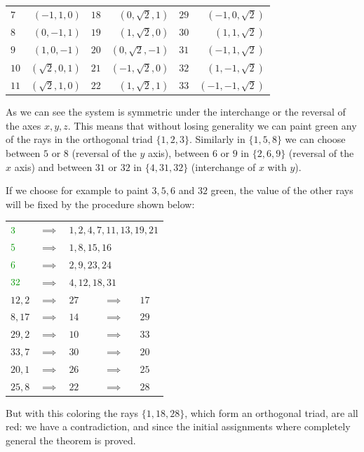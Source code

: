 \documentclass[a4paper]{article}
\newcommand{\red}[1]{\textcolor{dred}{#1}}
\newcommand{\green}[1]{\textcolor{dgreen}{#1}}
\theoremstyle{definition}
\let\oldproof\proof
\let\oldendproof\endproof
\renewenvironment{proof}
    {
        \begin{framed} 
        \oldproof
    }
    {
        \oldendproof 
        \end{framed}
    }
\begin{document}
\begin{proof}
\begin{center}
\begin{tabular}{lrlrlr}
        $7$ & $(-1, 1, 0)$ & $18$ & $(0, \sqrt{2}, 1)$  & $29$ & $(-1, 0,\sqrt{2})$ \\
        $8$ & $(0, -1, 1)$ & $19$ & $(1, \sqrt{2}, 0)$  & $30$ & $(1,1,\sqrt{2})$ \\
        $9$ & $(1, 0, -1)$ & $20$ & $(0, \sqrt{2}, -1)$  & $31$ & $(-1, 1, \sqrt{2})$ \\
        $10$ & $(\sqrt{2}, 0, 1)$ & $21$ & $(-1, \sqrt{2}, 0)$  & $32$ & $(1,-1, \sqrt{2})$ \\
        $11$ & $(\sqrt{2}, 1, 0)$ & $22$ & $(1, \sqrt{2}, 1)$  & $33$ & $(-1,-1, \sqrt{2})$ \\
    \end{tabular}   
    \end{center}
    As we can see the system is symmetric under the interchange or the reversal
    of the axes $x,y,z$.
    This means that without losing generality we can paint green any of
    the rays in the orthogonal triad $\{1,2,3\}$.
    Similarly in $\{1,5,8\}$  we can choose between $5$ or $8$ (reversal of the
    $y$ axis), between $6$ or $9$ in $\{2,6,9\}$ (reversal of the $x$ axis)
     and between $31$ or $32$ in $\{4,31,32\}$ (interchange of $x$ with $y$).

    If we choose for example to paint $3,5,6$ and $32$ green, the value of the other rays
    will be fixed by the procedure shown below: \\
    \begin{center}
    \begin{tabular}{lclcl}
        $\green{3}$  & $\implies$ & \multicolumn{3}{l}{\red{$1, 2, 4, 7,11, 13, 19, 21$}}\\
        $\green{5}$  & $\implies$ & \multicolumn{3}{l}{\red{$1, 8, 15, 16$}} \\
        $\green{6}$  & $\implies$ & \multicolumn{3}{l}{\red{$2, 9, 23, 24$}} \\
        $\green{32}$ & $\implies$ & \multicolumn{3}{l}{\red{$4,12,18,31$}} \\
        \midrule
        \red{$12,2$} & $\implies$ & \green{$27$} & $\implies$ & \red{$17$} \\
        \red{$8,17$} & $\implies$ & \green{$14$} & $\implies$ & \red{$29$} \\
        \red{$29,2$} & $\implies$ & \green{$10$} & $\implies$ & \red{$33$} \\
        \red{$33,7$} & $\implies$ & \green{$30$} & $\implies$ & \red{$20$} \\
        \red{$20,1$} & $\implies$ & \green{$26$} & $\implies$ & \red{$25$} \\
        \red{$25,8$} & $\implies$ & \green{$22$} & $\implies$ & \red{$28$} \\
    \end{tabular}
    \end{center}
    
    But with this coloring the rays $\{1,18,28\}$, which form an orthogonal
    triad, are all red: we have a contradiction, and since the initial assignments where
    completely general the theorem is proved.
\end{proof}
\end{document}

